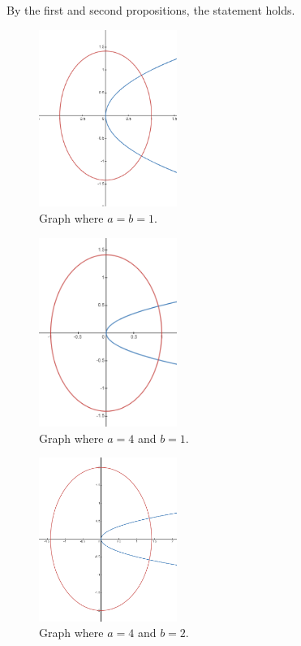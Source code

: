 \documentclass[../hw3.tex]{subfiles}
\begin{document}
By the first and second propositions, the statement holds.

\begin{figure}[ht]
    \centering
    \includegraphics[width=0.4\textwidth]{figures/ab11.png}  %
    \caption{Graph where $a=b=1$.}
\end{figure}

\begin{figure}[ht]
    \centering
    \includegraphics[width=0.4\textwidth]{figures/ab41.png}  %
    \caption{Graph where $a=4$ and $b=1$.}
\end{figure}

\begin{figure}[ht]
    \centering
    \includegraphics[width=0.4\textwidth]{figures/ab42.png}  %
    \caption{Graph where $a=4$ and $b=2$.}
\end{figure}
\end{document}
